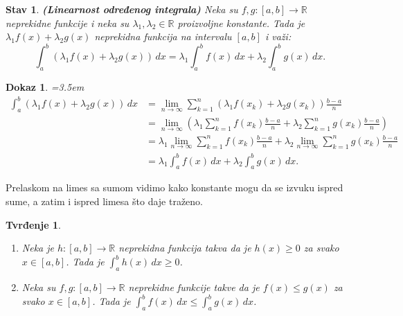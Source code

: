 \documentclass[11pt]{article}
\newcounter{mathitem}
\theoremstyle{plain}
\newtheorem{tvrdjenje}[mathitem]{Tvrđenje}
\newtheorem{stav}[mathitem]{Stav}
\theoremstyle{serbnodot}
\newtheorem*{dokaz}{Dokaz}
\begin{document}
\begin{stav}
\textbf{(Linearnost određenog integrala)} Neka su \( f,g:[a,b] \to \mathbb{R} \) neprekidne funkcije i neka su \( \lambda_1, \lambda_2 \in \mathbb{R} \) proizvoljne konstante. Tada je \( \lambda_1 f(x) + \lambda_2 g(x) \) neprekidna funkcija na intervalu \([a,b]\) i važi:
\[
  \int_{a}^{b} (\lambda_1 f(x) + \lambda_2 g(x)) \, dx = \lambda_1 \int_{a}^{b} f(x) \, dx + \lambda_2 \int_{a}^{b} g(x) \, dx.
\]

\end{stav}
\begin{dokaz}
    \par\hangindent=3.5em
    \begin{align*}
      \int_{a}^{b} (\lambda_1 f(x) + \lambda_2 g(x)) \, dx 
      &= \lim_{n \to \infty} \sum_{k=1}^{n} (\lambda_1 f(x_k) + \lambda_2 g(x_k)) \frac{b-a}{n} \\
      &= \lim_{n \to \infty} \left( \lambda_1 \sum_{k=1}^{n} f(x_k) \frac{b-a}{n} + \lambda_2 \sum_{k=1}^{n} g(x_k) \frac{b-a}{n} \right) \\
      &= \lambda_1 \lim_{n \to \infty} \sum_{k=1}^{n} f(x_k) \frac{b-a}{n} + \lambda_2 \lim_{n \to \infty} \sum_{k=1}^{n} g(x_k) \frac{b-a}{n} \\
      &= \lambda_1 \int_{a}^{b} f(x) \, dx + \lambda_2 \int_{a}^{b} g(x) \, dx.
    \end{align*}
\end{dokaz}
Prelaskom na limes sa sumom vidimo kako konstante mogu da se izvuku ispred sume, a zatim i ispred limesa što daje traženo.

\begin{tvrdjenje}
  \begin{enumerate}
    \item Neka je \( h:[a,b] \to \mathbb{R} \) neprekidna funkcija takva da je \( h(x) \geq 0 \) za svako \( x \in [a,b] \). Tada je \( \int_{a}^{b} h(x) \, dx \geq 0 \).
    \item Neka su \( f,g:[a,b] \to \mathbb{R} \) neprekidne funkcije takve da je \( f(x) \leq g(x) \) za svako \( x \in [a,b] \). Tada je \( \int_{a}^{b} f(x) \, dx \leq \int_{a}^{b} g(x) \, dx \).
  \end{enumerate}
\end{tvrdjenje}
\end{document}
